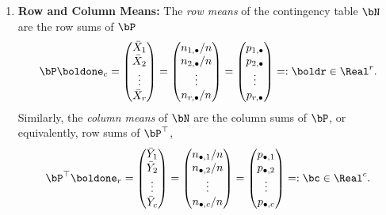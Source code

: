 \documentclass[12pt]{article}
\begin{document}
\begin{enumerate}[label=\textbf{\arabic*.}]
	\item \textbf{Row and Column Means:} The \emph{row means} of the contingency table $\bN$ are the row sums of $\bP$ 
	\begin{align*}
		\bP \boldone_{c} = \begin{pmatrix}
			\bar{X}_1 \\ 
			\bar{X}_2 \\ 
			\vdots \\ 
			\bar{X}_r
		\end{pmatrix} = 
		\begin{pmatrix}
			n_{1,\bullet} / n \\ 
			n_{2,\bullet} / n \\ 
			\vdots \\ 
			n_{r,\bullet} / n \\ 
		\end{pmatrix} = 
		\begin{pmatrix}
			p_{1,\bullet} \\ 
			p_{2,\bullet} \\ 
			\vdots \\ 
			p_{r,\bullet} \\
		\end{pmatrix} =: \boldr \in \Real^r. 
	\end{align*}
	Similarly, the \emph{column means} of $\bN$ are the column sums of $\bP$, or equivalently, row sums of $\bP^\top$, 
	\begin{align*}
		\bP^\top \boldone_{r} = \begin{pmatrix}
			\bar{Y}_1 \\ 
			\bar{Y}_2 \\ 
			\vdots \\ 
			\bar{Y}_c
		\end{pmatrix} = 
		\begin{pmatrix}
			n_{\bullet, 1} / n \\ 
			n_{\bullet, 2} / n \\ 
			\vdots \\ 
			n_{\bullet, c} / n \\ 
		\end{pmatrix} = 
		\begin{pmatrix}
			p_{\bullet, 1} \\ 
			p_{\bullet, 2} \\ 
			\vdots \\ 
			p_{\bullet, c} \\
		\end{pmatrix} =: \bc \in \Real^c. 
	\end{align*}
	

\end{enumerate}
\end{document}
